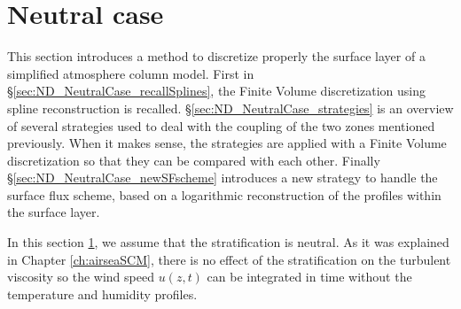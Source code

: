 \section{Neutral case}
\label{sec:ND_NeutralCase}
This section introduces a method to discretize properly
the surface layer of a simplified atmosphere column model.
First in \S \ref{sec:ND_NeutralCase_recallSplines},
the Finite Volume discretization using spline reconstruction
is recalled.
\S \ref{sec:ND_NeutralCase_strategies}
is an overview of several strategies used to deal
with the coupling of the two zones mentioned previously.
When it makes sense, the strategies are applied with a
Finite Volume discretization so that they can be
compared with each other.
Finally \S \ref{sec:ND_NeutralCase_newSFscheme}
introduces a new strategy to handle the surface flux scheme,
based on a logarithmic reconstruction of the profiles
within the surface layer.
\par
In this section \ref{sec:ND_NeutralCase},
we assume that the stratification is neutral.
As it was explained in Chapter \ref{ch:airseaSCM},
there is no effect of the stratification on the turbulent viscosity
so the wind speed $u(z, t)$ can be integrated in time
without the temperature and humidity profiles.
